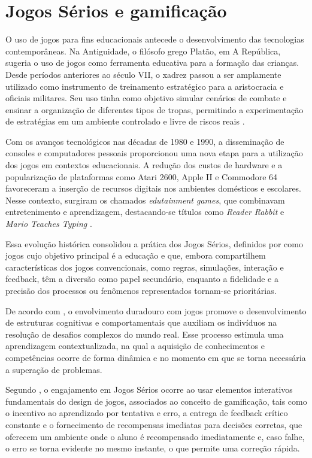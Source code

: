 \section{Jogos Sérios e gamificação}
O uso de jogos para fins educacionais antecede o desenvolvimento das tecnologias
contemporâneas. Na Antiguidade, o filósofo grego Platão, em A República, sugeria
o uso de jogos como ferramenta educativa para a formação das crianças. Desde
períodos anteriores ao século VII, o xadrez passou a ser amplamente utilizado
como instrumento de treinamento estratégico para a aristocracia e oficiais
militares. Seu uso tinha como objetivo simular cenários de combate e ensinar a
organização de diferentes tipos de tropas, permitindo a experimentação de
estratégias em um ambiente controlado e livre de riscos reais \cite{michael2006seriousgame}.

Com os avanços tecnológicos nas décadas de 1980 e 1990, a disseminação
de consoles e computadores pessoais proporcionou uma nova etapa para a
utilização dos jogos em contextos educacionais. A redução dos custos de hardware
e a popularização de plataformas como Atari 2600, Apple II e Commodore 64
favoreceram a inserção de recursos digitais nos ambientes domésticos e
escolares. Nesse contexto, surgiram os chamados \textit{edutainment games}, que
combinavam entretenimento e aprendizagem, destacando-se títulos como \textit{Reader
Rabbit} e \textit{Mario Teaches Typing} \cite{michael2006seriousgame}.

Essa evolução histórica consolidou a prática dos Jogos Sérios, definidos por
 como jogos cujo objetivo principal é a
educação e que, embora compartilhem características dos jogos convencionais,
como regras, simulações, interação e feedback, têm a diversão como papel
secundário, enquanto a fidelidade e a precisão dos processos ou fenômenos
representados tornam-se prioritárias.

De acordo com , o envolvimento duradouro com jogos
promove o desenvolvimento de estruturas cognitivas e comportamentais que
auxiliam os indivíduos na resolução de desafios complexos do mundo real. Esse
processo estimula uma aprendizagem contextualizada, na qual a aquisição de
conhecimentos e competências ocorre de forma dinâmica e no momento em que se
torna necessária a superação de problemas.

Segundo , o engajamento em Jogos Sérios ocorre ao
usar elementos interativos fundamentais do design de jogos, associados ao
conceito de gamificação, tais como o incentivo ao aprendizado por tentativa e
erro, a entrega de feedback crítico constante e o fornecimento de recompensas
imediatas para decisões corretas, que oferecem um ambiente onde o aluno é
recompensado imediatamente e, caso falhe, o erro se torna
evidente no mesmo instante, o que permite uma correção
rápida.

